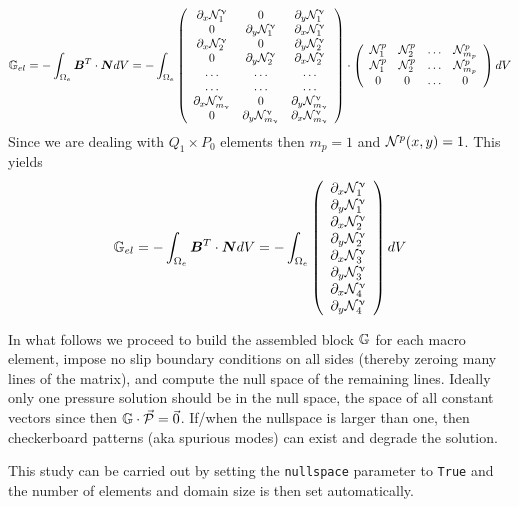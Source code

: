 \[
{\mathbb{G}}_{el} = -\int_{\Omega_e} {\bm B}^T \cdot {\bm N} dV
= -\int_{\Omega_e}
\left(
\begin{array}{ccc}
\partial_x {\mathcal{N}}_1^\upnu & 0 & \partial_y {\mathcal{N}}_1^\upnu \\
0 & \partial_y {\mathcal{N}}_1^\upnu & \partial_x {\mathcal{N}}_1^\upnu \\
\partial_x {\mathcal{N}}_2^\upnu & 0 & \partial_y {\mathcal{N}}_2^\upnu \\
0 & \partial_y {\mathcal{N}}_2^\upnu & \partial_x {\mathcal{N}}_2^\upnu \\
\dots & \dots & \dots \\
\dots & \dots & \dots \\
\partial_x {\mathcal{N}}_{m_\upnu}^\upnu & 0 & \partial_y {\mathcal{N}}_{m_\upnu}^\upnu \\
0 & \partial_y {\mathcal{N}}_{m_\upnu}^\upnu & \partial_x {\mathcal{N}}_{m_\upnu}^\upnu 
\end{array}
\right)
\cdot
\left(
\begin{array}{cccc}
{\mathcal{N}}_1^p & {\mathcal{N}}_2^p & \dots & {\mathcal{N}}_{m_p}^p \\ 
{\mathcal{N}}_1^p & {\mathcal{N}}_2^p & \dots & {\mathcal{N}}_{m_p}^p \\ 
0 & 0 & \dots & 0
\end{array}
\right)
dV
\]
Since we are dealing with $Q_1\times P_0$ elements then $m_p=1$ and ${\mathcal{N}}^p(x,y)=1$.
This yields
\[
{\mathbb{G}}_{el} = -\int_{\Omega_e} {\bm B}^T \cdot {\bm N} dV
= -\int_{\Omega_e}
\left(
\begin{array}{ccc}
\partial_x {\mathcal{N}}_1^\upnu \\
\partial_y {\mathcal{N}}_1^\upnu \\
\partial_x {\mathcal{N}}_2^\upnu \\
\partial_y {\mathcal{N}}_2^\upnu \\
\partial_x {\mathcal{N}}_3^\upnu \\
\partial_y {\mathcal{N}}_3^\upnu \\
\partial_x {\mathcal{N}}_4^\upnu \\
\partial_y {\mathcal{N}}_4^\upnu 
\end{array}
\right)
dV
\]

In what follows we proceed to build the assembled block ${\mathbb{G}}$ for each macro element, 
impose no slip boundary conditions on all sides (thereby zeroing many lines of the
matrix), and compute the null space of the remaining lines. 
Ideally only one pressure solution should be in the null space, the space of 
all constant vectors since then ${\mathbb{G}} \cdot \vec{\cal P}=\vec{0}$.
If/when the nullspace is larger than one, then checkerboard patterns (aka 
spurious modes) can exist and degrade the solution. 

This study can be carried out by setting the \lstinline{nullspace} parameter to 
\lstinline{True} and the number of elements and domain size is then set automatically.

